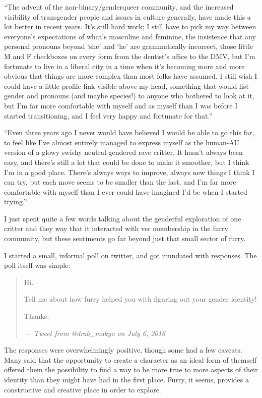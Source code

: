 ``The advent of the non-binary/genderqueer community, and the increased visibility of transgender people and issues in culture generally, have made this a lot better in recent years. It's still hard work; I still have to pick my way between everyone's expectations of what's masculine and feminine, the insistence that any personal pronouns beyond `she' and `he' are grammatically incorrect, those little M and F checkboxes on every form from the dentist's office to the DMV, but I'm fortunate to live in a liberal city in a time when it's becoming more and more obvious that things are more complex than most folks have assumed. I still wish I could have a little profile link visible above my head, something that would list gender and pronouns (and maybe species!) to anyone who bothered to look at it, but I'm far more comfortable with myself and as myself than I was before I started transitioning, and I feel very happy and fortunate for that.''

``Even three years ago I never would have believed I would be able to go this far, to feel like I've almost entirely managed to express myself as the human-AU version of a glowy swishy neutral-gendered rave critter. It hasn't always been easy, and there's still a lot that could be done to make it smoother, but I think I'm in a good place. There's always ways to improve, always new things I think I can try, but each move seems to be smaller than the last, and I'm far more comfortable with myself than I ever could have imagined I'd be when I started trying.''

\secdiv

I just spent quite a few words talking about the genderful exploration of one critter and they way that it interacted with ver membership in the furry community, but these sentiments go far beyond just that small sector of furry.

I started a small, informal poll on twitter, and got inundated with responses.  The poll itself was simple:

\begin{quotation}
  Hi.

  Tell me about how furry helped you with figuring out your gender identity!

  Thanks.

  \textit{--- Tweet from @drab\_makyo on July 6, 2016}
\end{quotation}

The responses were overwhelmingly positive, though some had a few caveats.  Many said that the opportunity to create a character as an ideal form of themself offered them the possibility to find a way to be more true to more aspects of their identity than they might have had in the first place.  Furry, it seems, provides a constructive and creative place in order to explore.

